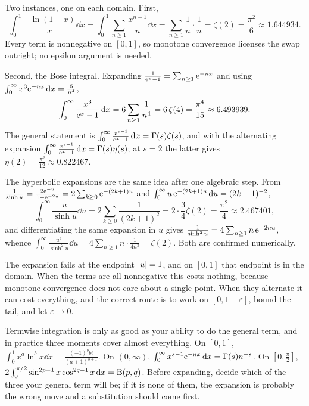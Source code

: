 \begin{worked}
Two instances, one on each domain. First,
\[\int_0^1\frac{-\ln(1-x)}{x}\dd x=\int_0^1\sum_{n\geq1}\frac{x^{n-1}}{n}\dd x=\sum_{n\geq1}\frac{1}{n}\cdot\frac1n=\zeta(2)=\frac{\pi^{2}}{6}\approx1.644934.\]
Every term is nonnegative on $[0,1]$, so monotone convergence licenses the swap outright; no epsilon argument is needed.

Second, the Bose integral. Expanding $\frac{1}{\mathrm{e}^{x}-1}=\sum_{n\geq1}\mathrm{e}^{-nx}$ and using $\int_0^\infty x^{3}\mathrm{e}^{-nx}\,\mathrm{d} x=\frac{6}{n^{4}}$,
\[\int_0^{\infty}\frac{x^{3}}{\mathrm{e}^{x}-1}\,\mathrm{d} x=6\sum_{n\geq1}\frac{1}{n^{4}}=6\,\zeta(4)=\frac{\pi^{4}}{15}\approx6.493939.\]
The general statement is $\int_0^\infty\frac{x^{s-1}}{\mathrm{e}^{x}-1}\,\mathrm{d} x=\Gamma(s)\zeta(s)$, and with the alternating expansion $\int_0^\infty\frac{x^{s-1}}{\mathrm{e}^{x}+1}\,\mathrm{d} x=\Gamma(s)\eta(s)$; at $s=2$ the latter gives $\eta(2)=\tfrac{\pi^{2}}{12}\approx0.822467$.

The hyperbolic expansions are the same idea after one algebraic step. From $\frac{1}{\sinh u}=\frac{2\mathrm{e}^{-u}}{1-\mathrm{e}^{-2u}}=2\sum_{k\geq0}\mathrm{e}^{-(2k+1)u}$ and $\int_0^\infty u\,\mathrm{e}^{-(2k+1)u}\,\mathrm{d} u=(2k+1)^{-2}$,
\[\int_0^{\infty}\frac{u}{\sinh u}\dd u=2\sum_{k\geq0}\frac{1}{(2k+1)^{2}}=2\cdot\frac34\zeta(2)=\frac{\pi^{2}}{4}\approx2.467401,\]
and differentiating the same expansion in $u$ gives $\frac{1}{\sinh^{2}u}=4\sum_{n\geq1}n\,\mathrm{e}^{-2nu}$, whence $\int_0^\infty\frac{u^{2}}{\sinh^{2}u}\dd u=4\sum_{n\geq1}n\cdot\frac{1}{4n^{3}}=\zeta(2)$. Both are confirmed numerically.
\end{worked}

\begin{trap}
The expansion fails at the endpoint $\left\lvert u\right\rvert=1$, and on $[0,1]$ that endpoint is in the domain. When the terms are all nonnegative this costs nothing, because monotone convergence does not care about a single point. When they alternate it can cost everything, and the correct route is to work on $[0,1-\varepsilon]$, bound the tail, and let $\varepsilon\to0$.
\end{trap}

\begin{keynote}
Termwise integration is only as good as your ability to do the general term, and in practice three moments cover almost everything. On $[0,1]$, $\int_0^1x^{a}\ln^{b}x\dd x=\frac{(-1)^{b}b!}{(a+1)^{b+1}}$. On $(0,\infty)$, $\int_0^\infty x^{s-1}\mathrm{e}^{-nx}\,\mathrm{d} x=\Gamma(s)n^{-s}$. On $[0,\tfrac{\pi}{2}]$, $2\int_0^{\pi/2}\sin^{2p-1}x\cos^{2q-1}x\,\mathrm{d} x=\mathrm{B}(p,q)$. Before expanding, decide which of the three your general term will be; if it is none of them, the expansion is probably the wrong move and a substitution should come first.
\end{keynote}

